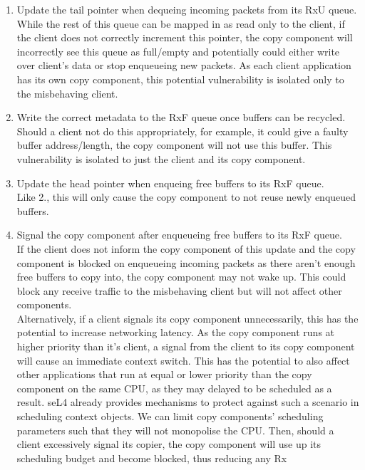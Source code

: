 \begin{enumerate}
    \item Update the tail pointer when dequeing incoming packets from its RxU queue.\\
    While the rest of this queue can be mapped in as read only to the client, if the client does not correctly increment this pointer,
    the copy component will incorrectly see this queue as full/empty and potentially could either write over client's data or stop
    enqueueing new packets. As each client application has its own copy component, this potential vulnerability is isolated only to
    the misbehaving client.
    \item Write the correct metadata to the RxF queue once buffers can be recycled.\\ 
    Should a client not do this appropriately, for example, it could give a faulty buffer address/length, the copy component will not 
    use this buffer. This vulnerability is isolated to just the client and its copy component.
    \item Update the head pointer when enqueing free buffers to its RxF queue.\\
    Like 2., this will only cause the copy component to not reuse newly enqueued buffers.
    \item Signal the copy component after enqueueing free buffers to its RxF queue.\\
    If the client does not inform the copy component of this update and the copy component is blocked on enqueueing incoming packets as there
    aren't enough free buffers to copy into, the copy component may not wake up. This could block any receive traffic to the misbehaving client
    but will not affect other components.\\
    Alternatively, if a client signals its copy component unnecessarily, this has the potential to increase networking latency. 
    As the copy component runs at higher priority than it's client, a signal from the client to its copy component will cause an immediate context
    switch. This has the potential to also affect other applications that run at equal or lower priority than the copy component on 
    the same CPU, as they may delayed to be scheduled as a result. seL4 already provides mechanisms to protect against such a scenario in 
    scheduling context objects. We can limit copy components' scheduling parameters such that they will not monopolise the CPU. Then, should 
    a client excessively signal its copier, the copy component will use up its scheduling budget and become blocked, thus reducing any Rx 

\end{enumerate}
